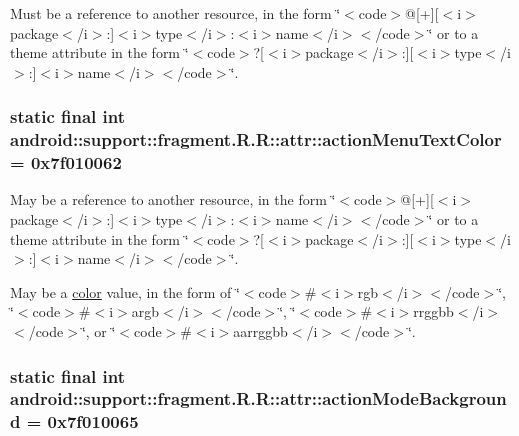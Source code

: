 Must be a reference to another resource, in the form \char`\"{}$<$code$>$@\mbox{[}+\mbox{]}\mbox{[}$<$i$>$package$<$/i$>$:\mbox{]}$<$i$>$type$<$/i$>$:$<$i$>$name$<$/i$>$$<$/code$>$\char`\"{} or to a theme attribute in the form \char`\"{}$<$code$>$?\mbox{[}$<$i$>$package$<$/i$>$:\mbox{]}\mbox{[}$<$i$>$type$<$/i$>$:\mbox{]}$<$i$>$name$<$/i$>$$<$/code$>$\char`\"{}. \hypertarget{classandroid_1_1support_1_1fragment_1_1_r_1_1attr_56f180f46c424c2e765d071b85cd79a9}{
\subsubsection[{actionMenuTextColor}]{\setlength{\rightskip}{0pt plus 5cm}static final int android::support::fragment.R.R::attr::actionMenuTextColor = 0x7f010062}}
\label{classandroid_1_1support_1_1fragment_1_1_r_1_1attr_56f180f46c424c2e765d071b85cd79a9}


May be a reference to another resource, in the form \char`\"{}$<$code$>$@\mbox{[}+\mbox{]}\mbox{[}$<$i$>$package$<$/i$>$:\mbox{]}$<$i$>$type$<$/i$>$:$<$i$>$name$<$/i$>$$<$/code$>$\char`\"{} or to a theme attribute in the form \char`\"{}$<$code$>$?\mbox{[}$<$i$>$package$<$/i$>$:\mbox{]}\mbox{[}$<$i$>$type$<$/i$>$:\mbox{]}$<$i$>$name$<$/i$>$$<$/code$>$\char`\"{}. 

May be a \hyperlink{classandroid_1_1support_1_1fragment_1_1_r_1_1color}{color} value, in the form of \char`\"{}$<$code$>$\#$<$i$>$rgb$<$/i$>$$<$/code$>$\char`\"{}, \char`\"{}$<$code$>$\#$<$i$>$argb$<$/i$>$$<$/code$>$\char`\"{}, \char`\"{}$<$code$>$\#$<$i$>$rrggbb$<$/i$>$$<$/code$>$\char`\"{}, or \char`\"{}$<$code$>$\#$<$i$>$aarrggbb$<$/i$>$$<$/code$>$\char`\"{}. \hypertarget{classandroid_1_1support_1_1fragment_1_1_r_1_1attr_1835b1211a4b21ef680c1ceef4720c82}{
\subsubsection[{actionModeBackground}]{\setlength{\rightskip}{0pt plus 5cm}static final int android::support::fragment.R.R::attr::actionModeBackground = 0x7f010065}}
\label{classandroid_1_1support_1_1fragment_1_1_r_1_1attr_1835b1211a4b21ef680c1ceef4720c82}


